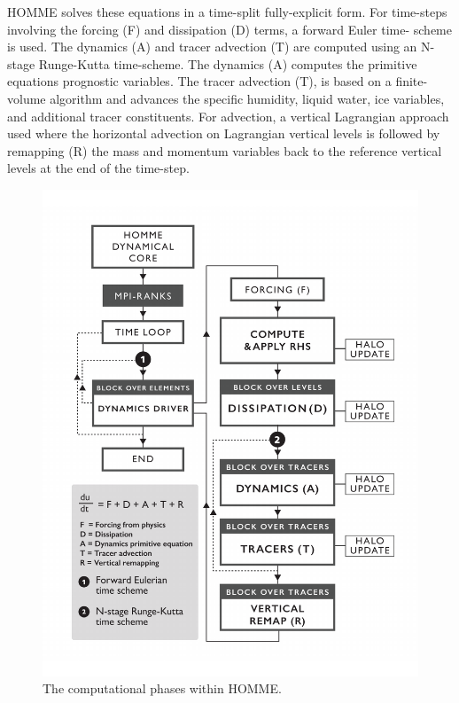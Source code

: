 HOMME solves these equations in a time-split fully-explicit form. For time-steps involving the forcing (F) and dissipation (D) terms, a forward Euler time- scheme is used. The dynamics (A) and tracer advection (T) are computed using an N-stage Runge-Kutta time-scheme. The dynamics (A) computes the primitive equations prognostic variables. The tracer advection (T), is based on a finite-volume algorithm and advances the specific humidity, liquid water, ice variables, and additional tracer constituents. For advection, a vertical Lagrangian approach used \cite{lin:2004} where the horizontal advection on Lagrangian vertical levels is followed by remapping (R) the mass and momentum variables back to the reference vertical levels at the end of the time-step.

\begin{figure}[tbp]
 \begin{center}
\includegraphics[width=12.0cm]{figures/HOMME-v01.pdf}
\end{center}
\caption{The computational phases within HOMME.}
\label{fig:homme-alg}
\end{figure}
